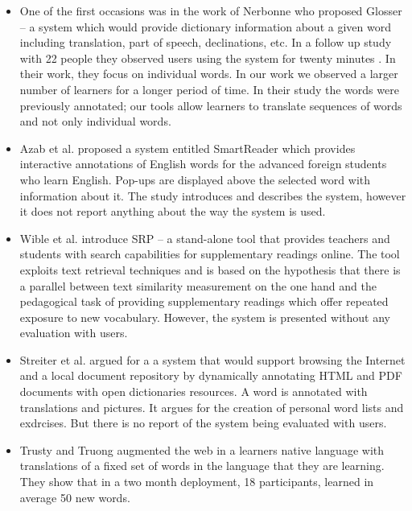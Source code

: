 \begin{itemize}

	\item One of the first occasions was in the work of Nerbonne \cite{Nerb99-Assistant} who proposed Glosser -- a system which would provide dictionary information about a given word including translation, part of speech, declinations, etc. 
	In a follow up study with 22 people they observed users using the system for twenty minutes \cite{Dokter98-UserStudy}. 
	In their work, they focus on individual words. 
	In our work we observed a larger number of learners for a longer period of time.
	In their study the words were previously annotated; our tools allow learners to translate sequences of words and not only individual words. 

	\item Azab et al. \cite{Azab13-nlp} proposed a system entitled SmartReader which provides interactive annotations of English words for the advanced foreign students who learn English. 
	Pop-ups are displayed above the selected word with information about it. 
	The study introduces and describes the system, however it does not report anything about the way the system is used.

	\item Wible et al. \cite{Wible01-Exposure} introduce SRP -- a stand-alone tool that provides teachers and students with search capabilities for supplementary readings online.
	The tool exploits text retrieval techniques and is based on the hypothesis that there is a parallel between text similarity measurement on the one hand and the pedagogical task of providing supplementary readings which offer repeated exposure to new vocabulary.
	However, the system is presented without any evaluation with users.

	\item Streiter et al. \cite{Streit05-Browsers} argued for a a system that would support browsing the Internet and a local document repository by dynamically annotating HTML and PDF documents with open dictionaries resources. A word is annotated with translations and pictures. It argues for the creation of personal word lists and exdrcises. But there is no report of the system being evaluated with users. 

	\item Trusty and Truong augmented the web in a learners native language with translations of a fixed set of words in the language that they are learning\cite{Trus11web}. They show that in a two month deployment, 18 participants, learned in average 50 new words.

\end{itemize}


